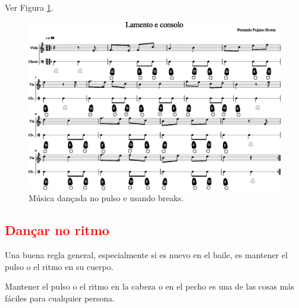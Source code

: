 Ver Figura \ref{fig:lamentoconsolopulsobreak1}.
\begin{figure}
    \centering
    \includegraphics[width=\textwidth]{chapters/cap-musicalidade-tecnica/lamento-e-consolo-clave-pulso+break-1.eps}
    \caption{Música dançada no pulso e usando breaks.}
    \label{fig:lamentoconsolopulsobreak1}
\end{figure}


\subsection{\textcolor{red}{Dançar no ritmo}}
Una buena regla general, especialmente si es nuevo en el baile, es mantener el pulso o el ritmo en su cuerpo.

Mantener el pulso o el ritmo en la cabeza o en el pecho es una de las cosas más fáciles para cualquier persona.

